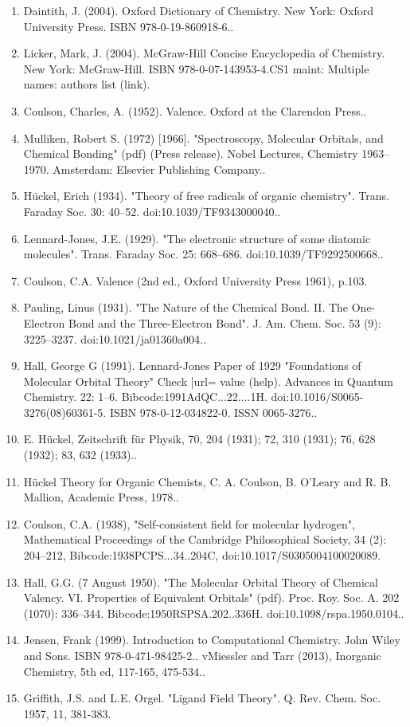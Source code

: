\begin{enumerate}
\item Daintith, J. (2004). Oxford Dictionary of Chemistry. New York: Oxford University Press. ISBN 978-0-19-860918-6..
\item Licker, Mark, J. (2004). McGraw-Hill Concise Encyclopedia of Chemistry. New York: McGraw-Hill. ISBN 978-0-07-143953-4.CS1 maint: Multiple names: authors list (link).
\item Coulson, Charles, A. (1952). Valence. Oxford at the Clarendon Press..
\item Mulliken, Robert S. (1972) [1966]. "Spectroscopy, Molecular Orbitals, and Chemical Bonding" (pdf) (Press release). Nobel Lectures, Chemistry 1963–1970. Amsterdam: Elsevier Publishing Company..
\item Hückel, Erich (1934). "Theory of free radicals of organic chemistry". Trans. Faraday Soc. 30: 40–52. doi:10.1039/TF9343000040..
\item Lennard-Jones, J.E. (1929). "The electronic structure of some diatomic molecules". Trans. Faraday Soc. 25: 668–686. doi:10.1039/TF9292500668..
\item Coulson, C.A. Valence (2nd ed., Oxford University Press 1961), p.103.
\item Pauling, Linus (1931). "The Nature of the Chemical Bond. II. The One-Electron Bond and the Three-Electron Bond". J. Am. Chem. Soc. 53 (9): 3225–3237. doi:10.1021/ja01360a004..
\item Hall, George G (1991). Lennard-Jones Paper of 1929 "Foundations of Molecular Orbital Theory" Check |url= value (help). Advances in Quantum Chemistry. 22: 1–6. Bibcode:1991AdQC...22....1H. doi:10.1016/S0065-3276(08)60361-5. ISBN 978-0-12-034822-0. ISSN 0065-3276..
\item E. Hückel, Zeitschrift für Physik, 70, 204 (1931); 72, 310 (1931); 76, 628 (1932); 83, 632 (1933)..
\item Hückel Theory for Organic Chemists, C. A. Coulson, B. O'Leary and R. B. Mallion, Academic Press, 1978..
\item Coulson, C.A. (1938), "Self-consistent field for molecular hydrogen", Mathematical Proceedings of the Cambridge Philosophical Society, 34 (2): 204–212, Bibcode:1938PCPS...34..204C, doi:10.1017/S0305004100020089.
\item Hall, G.G. (7 August 1950). "The Molecular Orbital Theory of Chemical Valency. VI. Properties of Equivalent Orbitals" (pdf). Proc. Roy. Soc. A. 202 (1070): 336–344. Bibcode:1950RSPSA.202..336H. doi:10.1098/rspa.1950.0104..
\item Jensen, Frank (1999). Introduction to Computational Chemistry. John Wiley and Sons. ISBN 978-0-471-98425-2..
vMiessler and Tarr (2013), Inorganic Chemistry, 5th ed, 117-165, 475-534..
\item Griffith, J.S. and L.E. Orgel. "Ligand Field Theory". Q. Rev. Chem. Soc. 1957, 11, 381-383.
\end{enumerate}
